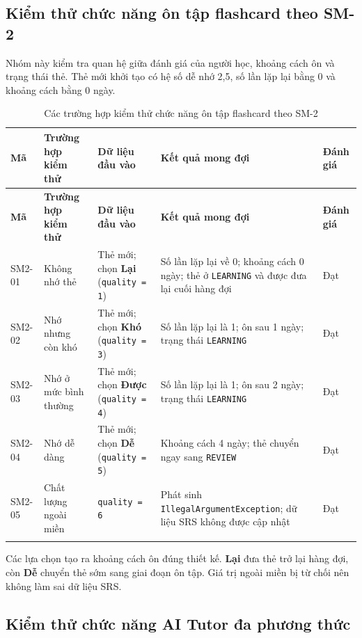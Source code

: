 \documentclass[../DoAn.tex]{subfiles}
\begin{document}
\subsection{Kiểm thử chức năng ôn tập flashcard theo SM-2}
\label{subsection:4.4.2}

Nhóm này kiểm tra quan hệ giữa đánh giá của người học, khoảng cách ôn và trạng thái thẻ. Thẻ mới khởi tạo có hệ số dễ nhớ 2,5, số lần lặp lại bằng 0 và khoảng cách bằng 0 ngày.

\begin{longtable}{|p{1.2cm}|p{2.8cm}|p{3.0cm}|p{5.0cm}|p{1.0cm}|}
\hline
\textbf{Mã} & \textbf{Trường hợp kiểm thử} & \textbf{Dữ liệu đầu vào} & \textbf{Kết quả mong đợi} & \textbf{Đánh giá} \\
\hline
\endfirsthead
\hline
\textbf{Mã} & \textbf{Trường hợp kiểm thử} & \textbf{Dữ liệu đầu vào} & \textbf{Kết quả mong đợi} & \textbf{Đánh giá} \\
\hline
\endhead
SM2-01 & Không nhớ thẻ & Thẻ mới; chọn \textbf{Lại} (\texttt{quality = 1}) & Số lần lặp lại về 0; khoảng cách 0 ngày; thẻ ở \texttt{LEARNING} và được đưa lại cuối hàng đợi & Đạt \\
\hline
SM2-02 & Nhớ nhưng còn khó & Thẻ mới; chọn \textbf{Khó} (\texttt{quality = 3}) & Số lần lặp lại là 1; ôn sau 1 ngày; trạng thái \texttt{LEARNING} & Đạt \\
\hline
SM2-03 & Nhớ ở mức bình thường & Thẻ mới; chọn \textbf{Được} (\texttt{quality = 4}) & Số lần lặp lại là 1; ôn sau 2 ngày; trạng thái \texttt{LEARNING} & Đạt \\
\hline
SM2-04 & Nhớ dễ dàng & Thẻ mới; chọn \textbf{Dễ} (\texttt{quality = 5}) & Khoảng cách 4 ngày; thẻ chuyển ngay sang \texttt{REVIEW} & Đạt \\
\hline
SM2-05 & Chất lượng ngoài miền & \texttt{quality = 6} & Phát sinh \texttt{Illegal\allowbreak Argument\allowbreak Exception}; dữ liệu SRS không được cập nhật & Đạt \\
\hline
\caption{Các trường hợp kiểm thử chức năng ôn tập flashcard theo SM-2}
\label{table:4.13}\\
\end{longtable}

Các lựa chọn tạo ra khoảng cách ôn đúng thiết kế. \textbf{Lại} đưa thẻ trở lại hàng đợi, còn \textbf{Dễ} chuyển thẻ sớm sang giai đoạn ôn tập. Giá trị ngoài miền bị từ chối nên không làm sai dữ liệu SRS.

\subsection{Kiểm thử chức năng AI Tutor đa phương thức}
\label{subsection:4.4.3}
\end{document}

